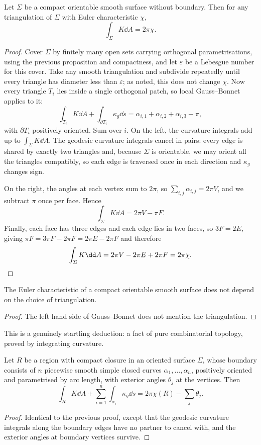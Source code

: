 \begin{theorem}
    Let $\Sigma$ be a compact orientable smooth surface without boundary. Then for any triangulation of $\Sigma$ with Euler characteristic $\chi$,
    $$
    \int_\Sigma K \dd A = 2\pi\chi.
    $$
\end{theorem}
\begin{proof}
    Cover $\Sigma$ by finitely many open sets carrying orthogonal parametrisations, using the previous proposition and compactness, and let $\varepsilon$ be a Lebesgue number for this cover. Take any smooth triangulation and subdivide repeatedly until every triangle has diameter less than $\varepsilon$; as noted, this does not change $\chi$. Now every triangle $T_i$ lies inside a single orthogonal patch, so local Gauss--Bonnet applies to it:
    $$
    \int_{T_i} K \dd A + \int_{\partial T_i}\kappa_g \dd s = \alpha_{i,1}+\alpha_{i,2}+\alpha_{i,3} - \pi,
    $$
    with $\partial T_i$ positively oriented. Sum over $i$. On the left, the curvature integrals add up to $\int_\Sigma K \dd A$. The geodesic curvature integrals cancel in pairs: every edge is shared by exactly two triangles and, because $\Sigma$ is orientable, we may orient all the triangles compatibly, so each edge is traversed once in each direction and $\kappa_g$ changes sign.

    On the right, the angles at each vertex sum to $2\pi$, so $\sum_{i,j}\alpha_{i,j} = 2\pi V$, and we subtract $\pi$ once per face. Hence
    $$
    \int_\Sigma K \dd A = 2\pi V - \pi F.
    $$
    Finally, each face has three edges and each edge lies in two faces, so $3F = 2E$, giving $\pi F = 3\pi F - 2\pi F = 2\pi E - 2\pi F$ and therefore
    $$
    \int_\Sigma K \dd A = 2\pi V - 2\pi E + 2\pi F = 2\pi \chi. \qedhere
    $$
\end{proof}

\begin{corollary}
    The Euler characteristic of a compact orientable smooth surface does not depend on the choice of triangulation.
\end{corollary}
\begin{proof}
    The left hand side of Gauss--Bonnet does not mention the triangulation.
\end{proof}

This is a genuinely startling deduction: a fact of pure combinatorial topology, proved by integrating curvature.

\begin{theorem}
    Let $R$ be a region with compact closure in an oriented surface $\Sigma$, whose boundary consists of $n$ piecewise smooth simple closed curves $\alpha_1,\dots,\alpha_n$, positively oriented and parametrised by arc length, with exterior angles $\theta_j$ at the vertices. Then
    $$
    \int_R K \dd A + \sum_{i=1}^n\int_{\alpha_i}\kappa_g \dd s = 2\pi\chi(R) - \sum_j\theta_j.
    $$
\end{theorem}
\begin{proof}
    Identical to the previous proof, except that the geodesic curvature integrals along the boundary edges have no partner to cancel with, and the exterior angles at boundary vertices survive.
\end{proof}

